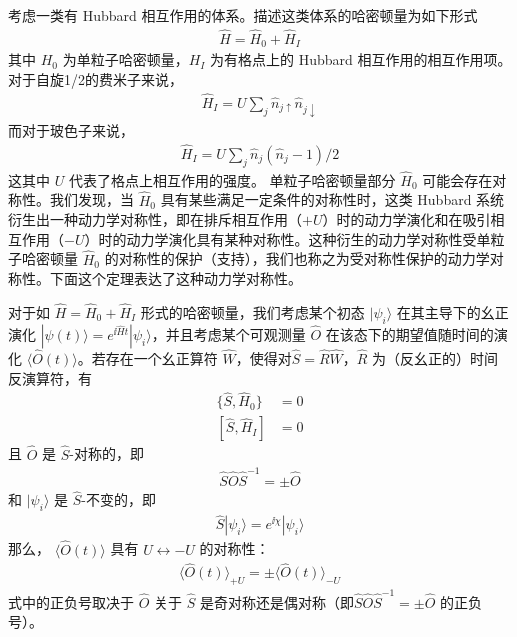考虑一类有 Hubbard 相互作用的体系。描述这类体系的哈密顿量为如下形式
\begin{align}
\hat{H} = \hat{H}_0 + \hat{H}_I
\end{align}
其中 $H_0$ 为单粒子哈密顿量，$H_I$ 为有格点上的 Hubbard 相互作用的相互作用项。对于自旋1/2的费米子来说，
\begin{align}
\hat{H}_I=U\sum_j\hat{n}_{j\uparrow}\hat{n}_{j\downarrow}
\end{align}
而对于玻色子来说，
\begin{align}
\hat{H}_I=U\sum_{j}\hat{n}_j(\hat{n}_j-1)/2
\end{align}
这其中 $U$ 代表了格点上相互作用的强度。
单粒子哈密顿量部分 $\hat{H}_0$ 可能会存在对称性。我们发现，当 $\hat{H}_0$ 具有某些满足一定条件的对称性时，这类 Hubbard 系统衍生出一种动力学对称性，即在排斥相互作用（$+U$）时的动力学演化和在吸引相互作用（$-U$）时的动力学演化具有某种对称性。这种衍生的动力学对称性受单粒子哈密顿量 $\hat{H}_0$ 的对称性的保护（支持），我们也称之为受对称性保护的动力学对称性\cite{dynsymm}。下面这个定理表达了这种动力学对称性。
\begin{theorem}\label{thm:dynsymm}
对于如 $\hat{H} = \hat{H}_0 + \hat{H}_I$ 形式的哈密顿量，我们考虑某个初态 $|\psi_i\rangle$ 在其主导下的幺正演化 $|\psi(t)\rangle = e^{\ii\hat{H}t}|\psi_i\rangle$，并且考虑某个可观测量 $\hat{O}$ 在该态下的期望值随时间的演化 $\langle\hat{O}(t)\rangle$。若存在一个幺正算符 $\hat{W}$，使得对$\hat{S}=\hat{R}\hat{W}$，$\hat{R}$ 为（反幺正的）时间反演算符，有
\begin{align}
\{\hat{S}, \hat{H}_0\} &= 0\\
[\hat{S}, \hat{H}_I] &= 0
\end{align}
且 $\hat{O}$ 是 $\hat{S}$-对称的，即
\begin{align}
\hat{S}\hat{O}\hat{S}^{-1} = \pm \hat{O}
\end{align}
和 $|\psi_i\rangle$ 是 $\hat{S}$-不变的，即
\begin{align}
\hat{S}|\psi_i\rangle = e^{\ii\chi}|\psi_i\rangle
\end{align}
那么， $\langle\hat{O}(t)\rangle$ 具有 $U\leftrightarrow-U$ 的对称性：
\begin{align}
\langle\hat{O}(t)\rangle_{+U} = \pm\langle\hat{O}(t)\rangle_{-U}
\end{align}
式中的正负号取决于 $\hat{O}$ 关于 $\hat{S}$ 是奇对称还是偶对称（即$\hat{S}\hat{O}\hat{S}^{-1} = \pm \hat{O}$ 的正负号）。
\end{theorem}

